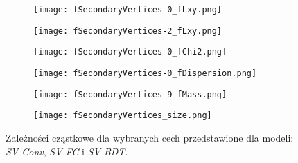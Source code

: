 \newcommand{\newWidth}{0.45\textwidth}
\begin{figure}[ht]
	\centering
    \begin{subfigure}[b]{\newWidth}
	\texttt{[image: fSecondaryVertices-0\_fLxy.png]}
	\caption{}
	\end{subfigure}
    \begin{subfigure}[b]{\newWidth}
	\texttt{[image: fSecondaryVertices-2\_fLxy.png]}
	\caption{}
	\end{subfigure}
    \begin{subfigure}[b]{\newWidth}
	\texttt{[image: fSecondaryVertices-0\_fChi2.png]}
	\caption{}
	\end{subfigure}
    \begin{subfigure}[b]{\newWidth}
	\texttt{[image: fSecondaryVertices-0\_fDispersion.png]}
	\caption{}
	\end{subfigure}
    \begin{subfigure}[b]{\newWidth}
	\texttt{[image: fSecondaryVertices-9\_fMass.png]}
	\caption{}
	\end{subfigure}
    \begin{subfigure}[b]{\newWidth}
	\texttt{[image: fSecondaryVertices\_size.png]}
	\caption{}
	\end{subfigure}
	\caption{Zależności cząstkowe dla wybranych cech przedstawione dla modeli: \textit{SV-Conv}, \textit{SV-FC} i \textit{SV-BDT}.}
	\label{fig:pdp-sv}
\end{figure}


